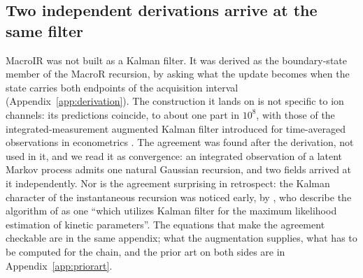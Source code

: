 \subsection*{Two independent derivations arrive at the same filter}
MacroIR was not built as a Kalman filter. It was derived as the boundary-state member of the MacroR recursion, by asking what the update becomes when the state carries both endpoints of the acquisition interval (Appendix~\ref{app:derivation}). The construction it lands on is not specific to ion channels: its predictions coincide, to about one part in $10^{8}$, with those of the integrated-measurement augmented Kalman filter introduced for time-averaged observations in econometrics \citep{zadrozny1988gaussian}. The agreement was found after the derivation, not used in it, and we read it as convergence: an integrated observation of a latent Markov process admits one natural Gaussian recursion, and two fields arrived at it independently. Nor is the agreement surprising in retrospect: the Kalman character of the instantaneous recursion was noticed early, by \citet{stepanyuk2011efficient}, who describe the algorithm of \citet{moffatt2007estimation} as one ``which utilizes Kalman filter for the maximum likelihood estimation of kinetic parameters''. The equations that make the agreement checkable are in the same appendix; what the augmentation supplies, what has to be computed for the chain, and the prior art on both sides are in Appendix~\ref{app:priorart}.

